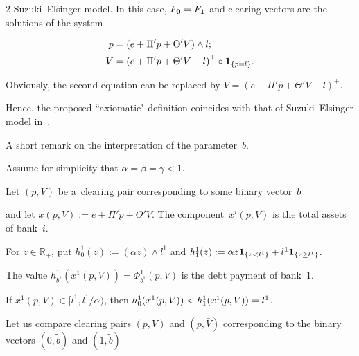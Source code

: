 \begin{multicols}{2}
Suzuki--Elsinger model. In this case, $F_{\bf 0} = F_{\bf 1}$ and clearing vectors are the solutions of the system 



\vspace*{-4pt}



\noindent

\begin{align*}

 p &= \left(e + \Pi' p + \Theta' V\right) \wedge l; \\

V &= \left(e + \Pi' p + \Theta' V - l\right)^+ \circ {\bf 1}_{\{p = l\}}.

\end{align*}



\vspace*{-4pt}



\noindent

Obviously, the second equation can be replaced by $V = (e + \Pi' p + \Theta' V - l)^+$. 

Hence, the proposed ``axiomatic" definition coincides with that of Suzuki--Elsinger model in~\cite{elsinger2009financial}.





\vspace*{2pt}



A short remark on the interpretation of the parameter~$b$.  

Assume for simplicity that $\alpha = \beta = \gamma < 1$.    

Let   $(p, V)$ be a~clearing pair corresponding to some binary vector~$b$ 

and let  $x(p,V) := e + \Pi' p + \Theta'V$. The component~$x^i(p,V)$ is the total  assets of bank~$i$. 

For $z \in \mathbb{R}_+$, put $h^1_0(z) := (\alpha z) \wedge l^1$ and $h^1_1 (z) := \alpha z {\bf 1}_{ \{ z < l^1 \} } + l^1 {\bf 1}_{ \{ z \geq l^1 \} }$.

The value $h^1_{b^1}(x^1(p, V)) = \Phi^1_{b^1}(p, V)$  is the debt payment of bank~1.  

If $x^1(p, V) \in [l^1, l^1/\alpha)$, then  $h^1_0(x^1(p, V))\linebreak < h^1_1(x^1(p, V)) = l^1$. 

Let us compare clearing pairs $(p,V)$ and $(\bar p,\bar V)$ corresponding to the binary vectors $(0,\tilde b)$ and $(1,\tilde b)$ 


\end{multicols}
